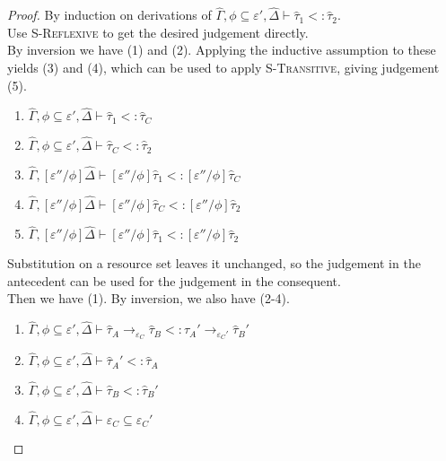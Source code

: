 \documentclass{llncs}
\begin{document}
\begin{proof}
By induction on derivations of $\hat \Gamma, \phi \subseteq \varepsilon', \hat \Delta \vdash \hat \tau_1 <: \hat \tau_2$.\\

 Use \textsc{S-Reflexive} to get the desired judgement directly.\\

 By inversion we have (1) and (2). Applying the inductive assumption to these yields (3) and (4), which can be used to apply \textsc{S-Transitive}, giving judgement (5).

\begin{enumerate}
	\item $\hat \Gamma, \phi \subseteq \varepsilon', \hat \Delta \vdash \hat \tau_1 <: \hat \tau_C$
	\item $\hat \Gamma, \phi \subseteq \varepsilon', \hat \Delta \vdash \hat \tau_C <: \hat \tau_2$
	\item $\hat \Gamma, [\varepsilon''/\phi]\hat \Delta \vdash [\varepsilon''/\phi]\hat \tau_1 <: [\varepsilon''/\phi]\hat \tau_C$
	\item $\hat \Gamma, [\varepsilon''/\phi]\hat \Delta \vdash [\varepsilon''/\phi]\hat \tau_C <: [\varepsilon''/\phi]\hat \tau_2$
	\item $\hat \Gamma, [\varepsilon''/\phi]\hat \Delta \vdash [\varepsilon''/\phi]\hat \tau_1 <: [\varepsilon''/\phi]\hat \tau_2$
\end{enumerate}

 Substitution on a resource set leaves it unchanged, so the judgement in the antecedent can be used for the judgement in the consequent.\\

 Then we have (1). By inversion, we also have (2-4).

\begin{enumerate}
	\item $\hat \Gamma, \phi \subseteq \varepsilon', \hat \Delta \vdash \hat \tau_A \rightarrow_{\varepsilon_C} \hat \tau_B <: \hat \tau_A' \rightarrow_{\varepsilon_C'} \hat \tau_B'$
	\item $\hat \Gamma, \phi \subseteq \varepsilon', \hat \Delta \vdash \hat \tau_A' <: \hat \tau_A$
	\item $\hat \Gamma, \phi \subseteq \varepsilon', \hat \Delta \vdash \hat \tau_B <: \hat \tau_B'$
	\item $\hat \Gamma, \phi \subseteq \varepsilon', \hat \Delta \vdash \varepsilon_C \subseteq \varepsilon_C'$
\end{enumerate}


\end{proof}
\end{document}
